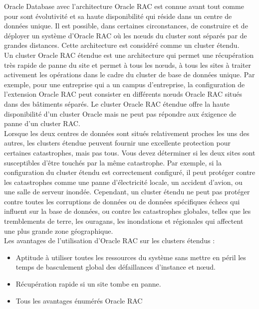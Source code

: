 \documentclass[12pt]{report}
\begin{document}
Oracle Database avec l'architecture Oracle RAC est connue avant tout comme pour
sont évolutivité et sa haute disponibilité qui réside dans un centre de données
unique. Il est possible, dans certaines circonstances, de construire et de
déployer un système d'Oracle RAC où les nœuds du cluster sont séparés par de
grandes distances. Cette architecture est considéré comme un cluster étendu. \\ 


Un cluster Oracle RAC étendue est une architecture qui permet une récupération
très rapide de panne du site et permet à tous les nœuds, à tous les sites à
traiter activement les opérations dans le cadre du cluster de base de données
unique. Par exemple, pour une entreprise qui a un campus d'entreprise, la
configuration de l'extension Oracle RAC peut consister en différents nœuds
Oracle RAC situés dans des bâtiments séparés. Le cluster Oracle RAC étendue
offre la haute disponibilité d'un cluster Oracle mais ne peut pas répondre aux
éxigence de panne d'un cluster RAC. \\


Lorsque les deux centres de données sont situés relativement proches les uns des
autres,  les clusters étendue peuvent fournir une excellente protection pour
certaines catastrophes, mais pas tous. Vous devez déterminer si les deux sites
sont susceptibles d'être touchés par la même catastrophe. Par exemple, si la
configuration du cluster étendu est correctement configuré, il peut protéger
contre les catastrophes comme une panne d'électricité locale, un accident
d'avion, ou une salle de serveur inondée. Cependant, un cluster étendu ne peut
pas protéger contre toutes les corruptions de données ou de données spécifiques
échecs qui influent sur la base de données, ou contre les catastrophes globales,
telles que les tremblements de terre, les ouragans, les inondations et
régionales qui affectent une plus grande zone géographique. \\


Les avantages de l'utilisation d'Oracle RAC sur les clusters étendus : \\

\begin{itemize}
\item Aptitude à utiliser toutes les ressources du système sans mettre en péril
  les temps de basculement global des défaillances d'instance et nœud.
\item Récupération rapide si un site tombe en panne.
\item Tous les avantages énumérés Oracle RAC 
\end{itemize}
\end{document}
